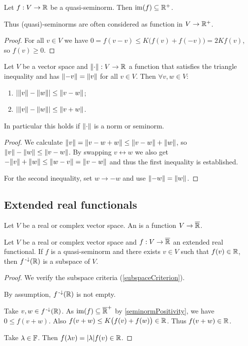 \begin{lemma} \label{seminormPositivity}
Let $f:V\to \mathbb{R}$ be a quasi-seminorm. Then $\operatorname{im}(f)\subseteq \mathbb{R}^+$.
\end{lemma}
Thus (quasi)-seminorms are often considered as function in $V\to \mathbb{R}^+$.
\begin{proof}
For all $v\in V$ we have $0 = f(v-v) \leq K\big(f(v)+f(-v)\big) = 2Kf(v)$, so $f(v) \geq 0$.
\end{proof}

\begin{proposition} \label{reverseTriangleInequality}
Let $V$ be a vector space and $\lVert\cdot\rVert: V\to \mathbb{R}$ a function that satisfies the triangle inequality and has $\lVert-v\rVert = \lVert v\rVert$ for all $v\in V$. Then $\forall v,w\in V$:
\begin{enumerate}
\item $|\lVert v\rVert-\lVert w\rVert|\leq \lVert v-w\rVert$;
\item $|\lVert v\rVert-\lVert w\rVert|\leq \lVert v+w\rVert$.
\end{enumerate}
In particular this holds if $\lVert\cdot\rVert$ is a norm or seminorm.
\end{proposition}
\begin{proof}
We calculate $\lVert v\rVert = \lVert v-w+w\rVert \leq \lVert v-w\rVert + \lVert w\rVert$, so $\lVert v\rVert-\lVert w\rVert\leq \lVert v-w\rVert$. By swapping $v\leftrightarrow w$ we also get $-\lVert v\rVert+\lVert w\rVert\leq \lVert w-v\rVert = \lVert v-w\rVert$ and thus the first inequality is established.

For the second inequality, set $w\to -w$ and use $\lVert-w\rVert = \lVert w\rVert$.
\end{proof}

\subsection{Extended real functionals}
\begin{definition}
Let $V$ be a real or complex vector space. An  is a function $V \to \overline{\mathbb{R}}$.
\end{definition}

\begin{lemma} \label{realPartExtendedRealFunctional}
Let $V$ be a real or complex vector space and $f: V\to \overline{\mathbb{R}}$ an extended real functional. If $f$ is a quasi-seminorm and there exists $v\in V$ such that $f(v)\in\mathbb{R}$, then $f^{{\text{\hspace{0.15em}-}\downarrow}}(\mathbb{R})$ is a subspace of $V$. 
\end{lemma}
\begin{proof}
We verify the subspace criteria (\ref{subspaceCriterion}). 

By assumption, $f^{{\text{\hspace{0.15em}-}\downarrow}}(\mathbb{R})$ is not empty.

Take $v,w\in f^{{\text{\hspace{0.15em}-}\downarrow}}(\mathbb{R})$. As $\operatorname{im}(f) \subseteq \overline{\mathbb{R}}^+$ by \ref{seminormPositivity}, we have $0\leq f(v+w)$. Also $f(v+w)\leq K\big(f(v)+f(w)\big)\in \mathbb{R}$. Thus $f(v+w)\in\mathbb{R}$.

Take $\lambda\in\mathbb{F}$. Then $f(\lambda v) = |\lambda|f(v)\in \mathbb{R}$.
\end{proof}


